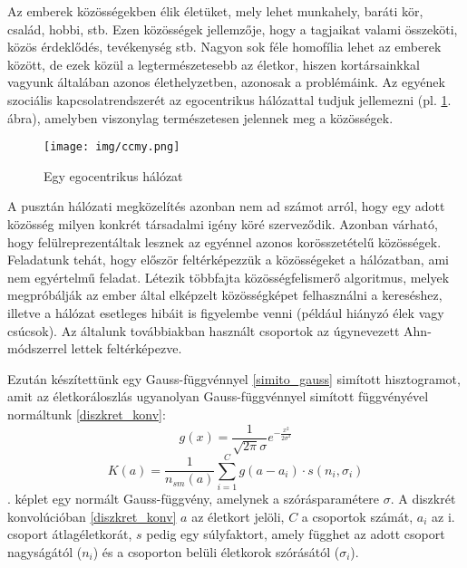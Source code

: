 \documentclass[12pt]{article}
\begin{document}
Az emberek közösségekben élik életüket, mely lehet munkahely, baráti kör, család, hobbi, stb. Ezen közösségek jellemzője, hogy a tagjaikat valami összeköti, közös érdeklődés, tevékenység stb. Nagyon sok féle homofília lehet az emberek között, de ezek közül a legtermészetesebb az életkor, hiszen kortársainkkal vagyunk általában azonos élethelyzetben, azonosak a problémáink. Az egyének szociális kapcsolatrendszerét az egocentrikus hálózattal tudjuk jellemezni (pl. \ref{egocentrikus}. ábra), amelyben viszonylag természetesen jelennek meg a közösségek.
\begin{figure}[H]
	\centering
	\texttt{[image: img/ccmy.png]}
	\caption{Egy egocentrikus hálózat} %
	\label{egocentrikus}
\end{figure}
A pusztán hálózati megközelítés azonban nem ad számot arról, hogy egy adott közösség milyen konkrét társadalmi igény köré szerveződik. Azonban várható, hogy felülreprezentáltak lesznek az egyénnel azonos korösszetételű közösségek.
Feladatunk tehát, hogy először feltérképezzük a közösségeket a hálózatban, ami nem egyértelmű feladat. Létezik \iffalse TODO: létezik helyett valami más szó \fi többfajta közösségfelismerő algoritmus, melyek megpróbálják az ember által elképzelt közösségképet felhasználni a kereséshez, illetve a hálózat esetleges hibáit is figyelembe venni (például hiányzó élek vagy csúcsok). Az általunk továbbiakban használt csoportok az úgynevezett Ahn-módszerrel \cite{tamas_gabor_tdk} \iffalse TODO: kell ez? \fi lettek feltérképezve. %

Ezután készítettünk egy Gauss-függvénnyel \eqref{simito_gauss} simított hisztogramot, amit az életkoráloszlás ugyanolyan Gauss-függvénnyel simított függvényével normáltunk \eqref{diszkret_konv}:
\begin{equation} \label{simito_gauss}
	g(x) = \frac{1}{\sqrt{2\pi}\sigma}e^{-\frac{x^2}{2\sigma^2}}
\end{equation}
\begin{equation} \label{diszkret_konv}
	K(a) = \frac{1}{n_{sm}(a)}\sum_{i=1}^{C} g(a-a_i) \cdot s(n_{i}, \sigma_{i}) %
\end{equation} %
. képlet egy normált Gauss-függvény, amelynek a szórásparamétere $\sigma$. A diszkrét konvolúcióban \eqref{diszkret_konv} $a$ az életkort jelöli, $C$ a csoportok számát, $a_i$ az i. csoport átlagéletkorát, $s$ pedig egy súlyfaktort, amely függhet az adott csoport nagyságától ($n_{i}$) és a csoporton belüli életkorok szórásától ($\sigma_i$).
\end{document}

